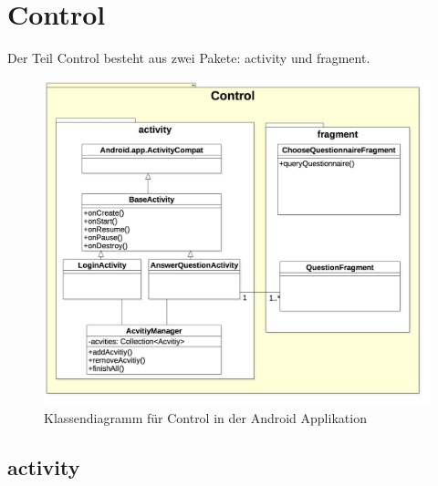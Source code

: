 \documentclass[a4paper]{scrreprt}
\begin{document}
        \section{Control}
            Der Teil Control besteht aus zwei Pakete: activity und fragment.

            \vspace*{1cm}
            \begin{figure}[H]
                \includegraphics[scale = 0.35]{Control.jpg}
                \caption{Klassendiagramm für Control in der Android Applikation }
            \end{figure}

            \subsection{activity}
\end{document}
